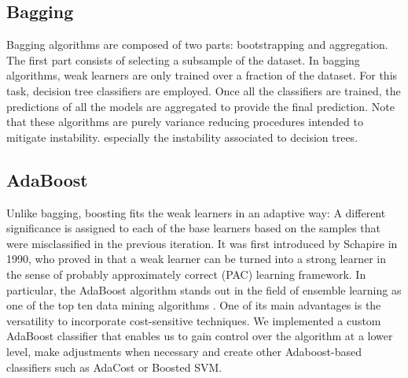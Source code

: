 \documentclass[conference]{IEEEtran}
\begin{document}
\subsection{Bagging}
Bagging algorithms are composed of two parts: bootstrapping and aggregation. The first part consists of selecting a subsample of the dataset. In bagging algorithms, weak learners are only trained over a fraction of the dataset. For this task, decision tree classifiers are employed. Once all the classifiers are trained, the predictions of all the models are aggregated to provide the final prediction. Note that these algorithms are purely variance reducing procedures intended to mitigate instability. especially the instability associated to decision trees.

\subsection{AdaBoost}
Unlike bagging, boosting fits the weak learners in an adaptive way: A different significance is assigned to each of the base learners based on the samples that were misclassified in the previous iteration. It was first introduced by Schapire in 1990, who proved in \cite{schapire} that a weak learner can be turned into a strong learner in the sense of probably approximately correct (PAC) learning framework. In particular, the AdaBoost algorithm stands out in the field of ensemble learning as one of the top ten data mining algorithms \cite{top10algo}. One of its main advantages is the versatility to incorporate cost-sensitive techniques. We implemented a custom AdaBoost classifier that enables us to gain control over the algorithm at a lower level, make adjustments when necessary and create other Adaboost-based classifiers such as AdaCost or Boosted SVM. %
\end{document}
